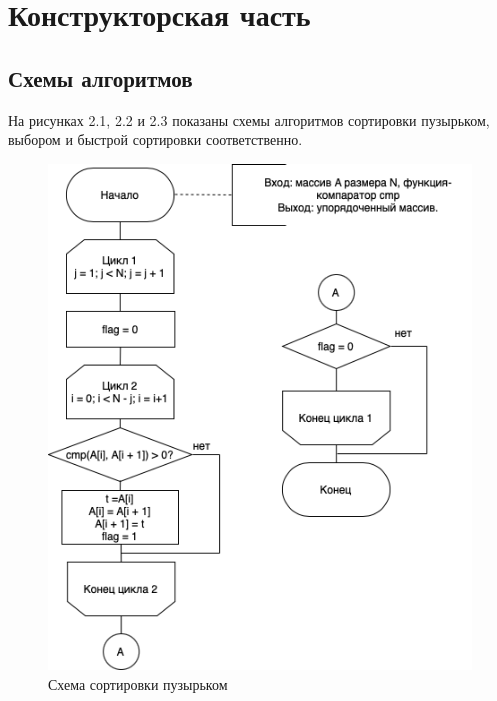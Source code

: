 \documentclass{report}
\begin{document}
\clearpage

\chapter{Конструкторская часть}

\section{Схемы алгоритмов}

На рисунках 2.1, 2.2 и 2.3 показаны схемы алгоритмов сортировки пузырьком, выбором и быстрой сортировки соответственно.

\begin{figure}[h]
	\centering
	\includegraphics[width=0.9\linewidth]{bsort.png}
	\caption{Схема сортировки пузырьком}
	\label{fig:mpr}
\end{figure}
\end{document}
